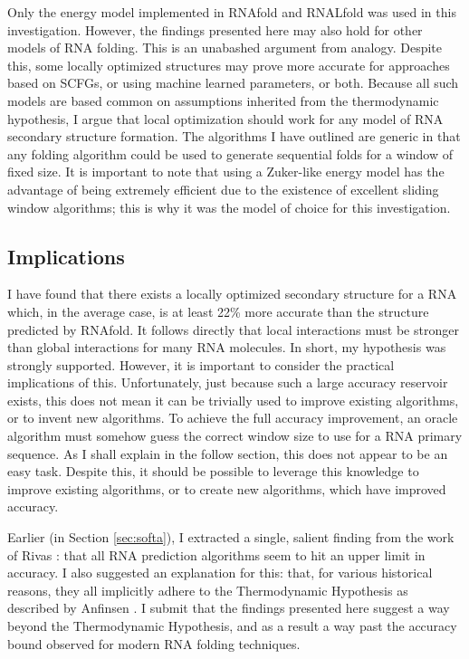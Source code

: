 \documentclass{cshonours}
\begin{document}
Only the energy model implemented in RNAfold and RNALfold was used in this investigation. However, the findings presented here may also hold for other models of RNA folding. This is an unabashed argument from analogy. Despite this, some locally optimized structures may prove more accurate for approaches based on SCFGs, or using machine learned parameters, or both. Because all such models are based common on assumptions inherited from the thermodynamic hypothesis, I argue that local optimization should work for any model of RNA secondary structure formation. The algorithms I have outlined are generic in that any folding algorithm could be used to generate sequential folds for a window of fixed size. It is important to note that using a Zuker-like energy model has the advantage of being extremely efficient due to the existence of excellent sliding window algorithms; this is why it was the model of choice for this investigation.

\subsection{Implications}

I have found that there exists a locally optimized secondary structure for a RNA which, in the average case, is at least 22\% more accurate than the structure predicted by RNAfold. It follows directly that local interactions must be stronger than global interactions for many RNA molecules. In short, my hypothesis was strongly supported. However, it is important to consider the practical implications of this. Unfortunately, just because such a large accuracy reservoir exists, this does not mean it can be trivially used to improve existing algorithms, or to invent new algorithms. To achieve the full accuracy improvement, an oracle algorithm must somehow guess the correct window size to use for a RNA primary sequence. As I shall explain in the follow section, this does not appear to be an easy task. Despite this, it should be possible to leverage this knowledge to improve existing algorithms, or to create new algorithms, which have improved accuracy. 

Earlier (in Section \ref{sec:softa}), I extracted a single, salient finding from the work of Rivas \cite{rivas2013four}: that all RNA prediction algorithms seem to hit an upper limit in accuracy. I also suggested an explanation for this: that, for various historical reasons, they all implicitly adhere to the Thermodynamic Hypothesis as described by Anfinsen \cite{anfinsen1973principles}. I submit that the findings presented here suggest a way beyond the Thermodynamic Hypothesis, and as a result a way past the accuracy bound observed for modern RNA folding techniques.
\end{document}
